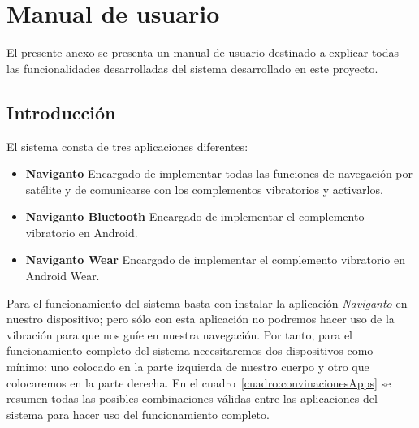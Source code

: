 \chapter{Manual de usuario}
\label{chap:manual}

El presente anexo se presenta un manual de usuario destinado a explicar todas las funcionalidades
desarrolladas del sistema desarrollado en este proyecto.

\section{Introducción}

El sistema consta de tres aplicaciones diferentes:

\begin{itemize}
  \item \textbf{Naviganto} Encargado de implementar todas las funciones de navegación por satélite y
    de comunicarse con los complementos vibratorios y activarlos.
  \item \textbf{Naviganto Bluetooth} Encargado de implementar el complemento vibratorio en
    Android.
  \item \textbf{Naviganto Wear} Encargado de implementar el complemento vibratorio en Android Wear.
\end{itemize}

Para el funcionamiento del sistema basta con instalar la aplicación \emph{Naviganto} en nuestro
dispositivo; pero sólo con esta aplicación no podremos hacer uso de la vibración para que nos guíe
en nuestra navegación. Por tanto, para el funcionamiento completo del sistema necesitaremos dos
dispositivos como mínimo: uno colocado en la parte izquierda de nuestro cuerpo y otro que
colocaremos en la parte derecha. En el cuadro~\ref{cuadro:convinacionesApps} se resumen todas las
posibles combinaciones válidas entre las aplicaciones del sistema para hacer uso del funcionamiento
completo.

